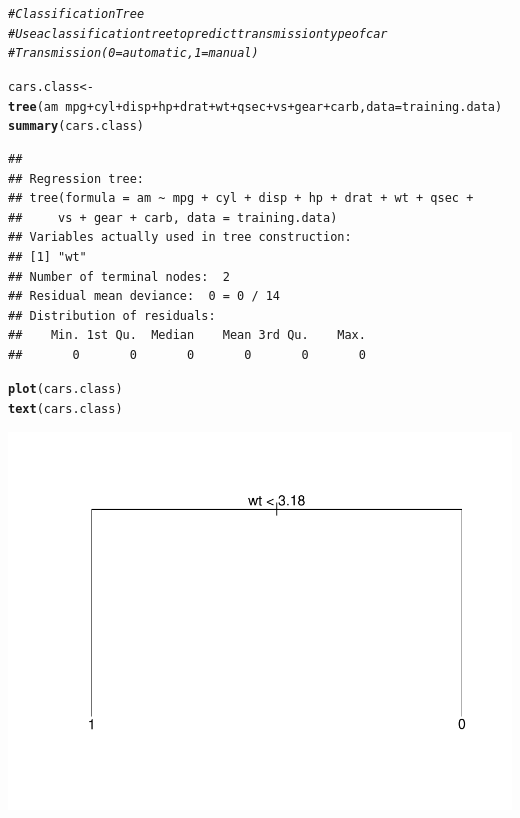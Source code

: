 \documentclass{article}\usepackage[]{graphicx}\usepackage[]{color}
\makeatletter
\def\maxwidth{ %
  \ifdim\Gin@nat@width>\linewidth
    \linewidth
  \else
    \Gin@nat@width
  \fi
}
\newcommand{\hlcom}[1]{\textcolor[rgb]{0.678,0.584,0.686}{\textit{#1}}}%
\newcommand{\hlopt}[1]{\textcolor[rgb]{0,0,0}{#1}}%
\newcommand{\hlstd}[1]{\textcolor[rgb]{0.345,0.345,0.345}{#1}}%
\newcommand{\hlkwb}[1]{\textcolor[rgb]{0.69,0.353,0.396}{#1}}%
\newcommand{\hlkwc}[1]{\textcolor[rgb]{0.333,0.667,0.333}{#1}}%
\newcommand{\hlkwd}[1]{\textcolor[rgb]{0.737,0.353,0.396}{\textbf{#1}}}%
\newenvironment{kframe}{%
 \def\at@end@of@kframe{}%
 \ifinner\ifhmode%
  \def\at@end@of@kframe{\end{minipage}}%
  \begin{minipage}{\columnwidth}%
 \fi\fi%
 \def\FrameCommand##1{\hskip\@totalleftmargin \hskip-\fboxsep
 \colorbox{shadecolor}{##1}\hskip-\fboxsep
     \hskip-\linewidth \hskip-\@totalleftmargin \hskip\columnwidth}%
 \MakeFramed {\advance\hsize-\width
   \@totalleftmargin\z@ \linewidth\hsize
   \@setminipage}}%
 {\par\unskip\endMakeFramed%
 \at@end@of@kframe}
\newenvironment{knitrout}{}{} %
\makeatother
\begin{document}
\begin{knitrout}
\color{fgcolor}\begin{kframe}
\begin{alltt}
\hlcom{# Classification Tree}
\hlcom{# Use a classification tree to predict transmission type of car}
\hlcom{# Transmission (0 = automatic, 1 = manual)}

\hlstd{cars.class}\hlkwb{<-}\hlkwd{tree}\hlstd{(am} \hlopt{~} \hlstd{mpg}\hlopt{+}\hlstd{cyl}\hlopt{+}\hlstd{disp}\hlopt{+}\hlstd{hp}\hlopt{+}\hlstd{drat}\hlopt{+}\hlstd{wt}\hlopt{+}\hlstd{qsec}\hlopt{+}\hlstd{vs}\hlopt{+}\hlstd{gear}\hlopt{+}\hlstd{carb,} \hlkwc{data}\hlstd{=training.data)}
\hlkwd{summary}\hlstd{(cars.class)}
\end{alltt}
\begin{verbatim}
## 
## Regression tree:
## tree(formula = am ~ mpg + cyl + disp + hp + drat + wt + qsec + 
##     vs + gear + carb, data = training.data)
## Variables actually used in tree construction:
## [1] "wt"
## Number of terminal nodes:  2 
## Residual mean deviance:  0 = 0 / 14 
## Distribution of residuals:
##    Min. 1st Qu.  Median    Mean 3rd Qu.    Max. 
##       0       0       0       0       0       0
\end{verbatim}
\begin{alltt}
\hlkwd{plot}\hlstd{(cars.class)}
\hlkwd{text}\hlstd{(cars.class)}
\end{alltt}
\end{kframe}
\includegraphics[width=\maxwidth]{figure/unnamed-chunk-3-1} 
\begin{kframe}\begin{alltt}

\end{alltt}
\end{kframe}
\end{knitrout}
\end{document}
